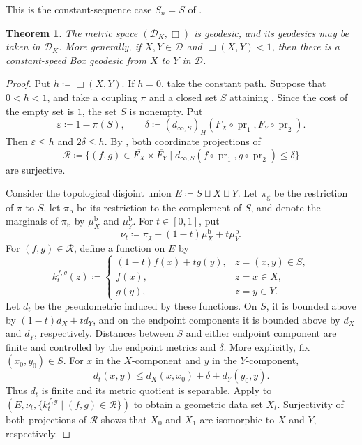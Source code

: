 \documentclass[10pt,a4paper]{amsart}
\newtheorem{theorem}{Theorem}[section]
\newcommand{\D}{\mathcal D}
\newcommand{\DK}{\mathcal D_K}
\DeclareMathOperator{\pr}{pr}
\begin{document}
This is the constant-sequence case $S_n=S$ of \cite[Lemma~5.18]{gds1}.

\begin{theorem}
\label{thm:box-geodesic}
The metric space $(\DK,\Box)$ is geodesic, and its geodesics may be taken in $\DK$. More generally, if $X,Y\in\D$ and $\Box(X,Y)<1$, then there is a constant-speed Box geodesic from $X$ to $Y$ in $\D$.
\end{theorem}

\begin{proof}
Put $h\coloneqq\Box(X,Y)$. If $h=0$, take the constant path. Suppose that $0<h<1$, and take a coupling $\pi$ and a closed set $S$ attaining . Since the cost of the empty set is $1$, the set $S$ is nonempty. Put
\[
\varepsilon\coloneqq1-\pi(S),\qquad
\delta\coloneqq(d_{\infty,S})_H
(\overline{F_X}\circ\pr_1,\overline{F_Y}\circ\pr_2).
\]
Then $\varepsilon\leq h$ and $2\delta\leq h$. By , both coordinate projections of
\[
\mathcal R\coloneqq
\{(f,g)\in\overline{F_X}\times\overline{F_Y}\mid
d_{\infty,S}(f\circ\pr_1,g\circ\pr_2)\leq\delta\}
\]
are surjective.

Consider the topological disjoint union $E\coloneqq S\sqcup X\sqcup Y$. Let $\pi_{\mathrm g}$ be the restriction of $\pi$ to $S$, let $\pi_{\mathrm b}$ be its restriction to the complement of $S$, and denote the marginals of $\pi_{\mathrm b}$ by $\mu_X^{\mathrm b}$ and $\mu_Y^{\mathrm b}$. For $t\in[0,1]$, put
\[
\nu_t\coloneqq\pi_{\mathrm g}+(1-t)\mu_X^{\mathrm b}+t\mu_Y^{\mathrm b}.
\]
For $(f,g)\in\mathcal R$, define a function on $E$ by
\[
k_t^{f,g}(z)\coloneqq
\begin{cases}
(1-t)f(x)+tg(y),&z=(x,y)\in S,\\
f(x),&z=x\in X,\\
g(y),&z=y\in Y.
\end{cases}
\]
Let $d_t$ be the pseudometric induced by these functions. On $S$, it is bounded above by $(1-t)d_X+td_Y$, and on the endpoint components it is bounded above by $d_X$ and $d_Y$, respectively. Distances between $S$ and either endpoint component are finite and controlled by the endpoint metrics and $\delta$. More explicitly, fix $(x_0,y_0)\in S$. For $x$ in the $X$-component and $y$ in the $Y$-component,
\[
d_t(x,y)\leq d_X(x,x_0)+\delta+d_Y(y_0,y).
\]
Thus $d_t$ is finite and its metric quotient is separable. Apply  to $(E,\nu_t,\{k_t^{f,g}\mid(f,g)\in\mathcal R\})$ to obtain a geometric data set $X_t$. Surjectivity of both projections of $\mathcal R$ shows that $X_0$ and $X_1$ are isomorphic to $X$ and $Y$, respectively.


\end{proof}
\end{document}
